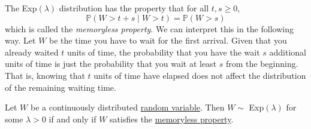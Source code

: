  \begin{lemma}
    \label{thm:memoryless-property}
    The Exp$(\lambda)$ distribution has the property that for all $t, s \geq 0$, 
    \begin{equation}
      \mathbb{P}(W > t + s \; | \; W > t) = \mathbb{P}(W > s)
    \end{equation}
    which is called the \textit{memoryless property}. We can interpret this in the following way. Let $W$ be the time you have to wait for the first arrival. Given that you already waited $t$ units of time, the probability that you have the wait $s$ additional units of time is just the probability that you wait at least $s$ from the beginning. That is, knowing that $t$ units of time have elapsed does not affect the distribution of the remaining waiting time. 
  \end{lemma}

  \begin{theorem}
    \label{thm:characterization-of-the-exponential-distribution}
    Let $W$ be a continuously distributed \hyperref[def:random-variable]{random variable}. Then $W \sim$ Exp$(\lambda)$ for some $\lambda > 0$ if and only if $W$ satisfies the \hyperref[thm:memoryless-property]{memoryless property}. 
  \end{theorem}

